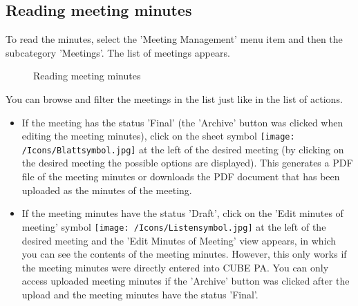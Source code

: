 \subsection{Reading meeting minutes}

To read the minutes, select the 'Meeting Management' menu item and then the subcategory 'Meetings'. The list of meetings appears.

\begin{figure}[H]
\caption{Reading meeting minutes}
\end{figure}

You can browse and filter the meetings in the list just like in the list of actions.
\begin{itemize}
\item
If the meeting has the status 'Final' (the 'Archive' button was clicked when editing the meeting minutes), click on the sheet symbol \texttt{[image: /Icons/Blattsymbol.jpg]}  at the left of the desired meeting (by clicking on the desired meeting the possible options are displayed). This generates a PDF file of the meeting minutes or downloads the PDF document that has been uploaded as the minutes of the meeting.
\item
If the meeting minutes have the status 'Draft', click on the 'Edit minutes of meeting' symbol \texttt{[image: /Icons/Listensymbol.jpg]}  at the left of the desired meeting and the 'Edit Minutes of Meeting' view appears, in which you can see the contents of the meeting minutes. However, this only works if the meeting minutes were directly entered into CUBE PA. You can only access uploaded meeting minutes if the 'Archive' button was clicked after the upload and the meeting minutes have the status 'Final'.
\end{itemize}

